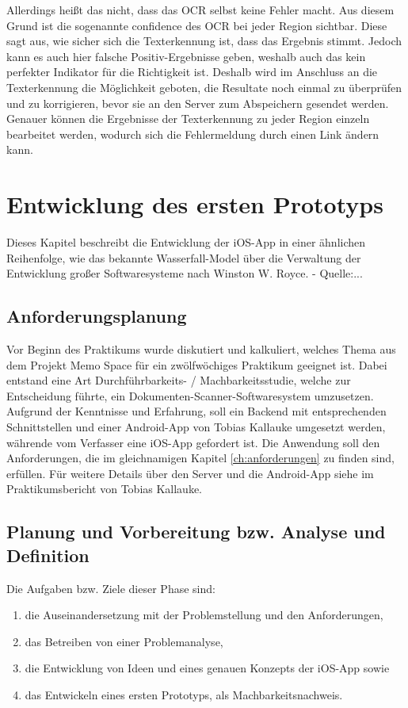 \documentclass[nomenclature, oneside, 150]{HSMW-Thesis}
\begin{document}
	Allerdings heißt das nicht, dass das OCR selbst keine Fehler macht. Aus diesem Grund ist die sogenannte confidence des OCR bei jeder Region sichtbar. Diese sagt aus, wie sicher sich die Texterkennung ist, dass das Ergebnis stimmt. Jedoch kann es auch hier falsche Positiv-Ergebnisse geben, weshalb auch das kein perfekter Indikator für die Richtigkeit ist. Deshalb wird im Anschluss an die Texterkennung die Möglichkeit geboten, die Resultate noch einmal zu überprüfen und zu korrigieren, bevor sie an den Server zum Abspeichern gesendet werden. Genauer können die Ergebnisse der Texterkennung zu jeder Region einzeln bearbeitet werden, wodurch sich die Fehlermeldung durch einen Link ändern kann.


\chapter{Entwicklung des ersten Prototyps}\label{ch:prototyp}
	Dieses Kapitel beschreibt die Entwicklung der iOS-App in einer ähnlichen Reihenfolge, wie das bekannte Wasserfall-Model über die Verwaltung der Entwicklung großer Softwaresysteme nach Winston W. Royce. - Quelle:...
	
	\section{Anforderungsplanung}\label{sc:anforderungsplanung}
	Vor Beginn des Praktikums wurde diskutiert und kalkuliert, welches Thema aus dem Projekt Memo Space für ein zwölfwöchiges Praktikum geeignet ist. Dabei entstand eine Art Durchführbarkeits- / Machbarkeitsstudie, welche zur Entscheidung führte, ein Dokumenten-Scanner-Softwaresystem umzusetzen. Aufgrund der Kenntnisse und Erfahrung, soll ein Backend mit entsprechenden Schnittstellen und einer Android-App von Tobias Kallauke umgesetzt werden, währende vom Verfasser eine iOS-App gefordert ist. Die Anwendung soll den Anforderungen, die im gleichnamigen Kapitel \ref{ch:anforderungen} zu finden sind, erfüllen. Für weitere Details über den Server und die Android-App siehe im Praktikumsbericht von Tobias Kallauke.

	\section{Planung und Vorbereitung bzw. Analyse und Definition}
		Die Aufgaben bzw. Ziele dieser Phase sind:
		\begin{enumerate}
			\item die Auseinandersetzung mit der Problemstellung und den Anforderungen,
			\item das Betreiben von einer Problemanalyse,
			\item die Entwicklung von Ideen und eines genauen Konzepts der iOS-App sowie 
			\item das Entwickeln eines ersten Prototyps, als Machbarkeitsnachweis.
		\end{enumerate}
		
\end{document}
